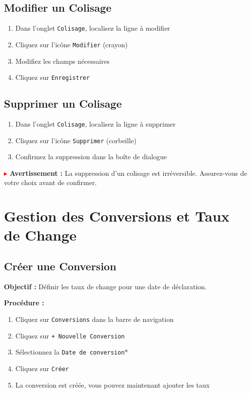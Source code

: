 \documentclass[12pt,a4paper]{report}
\begin{document}
\subsection{Modifier un Colisage}

\begin{enumerate}[leftmargin=*]
    \item Dans l'onglet \texttt{Colisage}, localisez la ligne à modifier
    \item Cliquez sur l'icône \texttt{Modifier} (crayon)
    \item Modifiez les champs nécessaires
    \item Cliquez sur \texttt{Enregistrer}
\end{enumerate}

\subsection{Supprimer un Colisage}

\begin{enumerate}[leftmargin=*]
    \item Dans l'onglet \texttt{Colisage}, localisez la ligne à supprimer
    \item Cliquez sur l'icône \texttt{Supprimer} (corbeille)
    \item Confirmez la suppression dans la boîte de dialogue
\end{enumerate}

\textcolor{red}{$\blacktriangleright$} \textbf{Avertissement :} La suppression d'un colisage est irréversible. Assurez-vous de votre choix avant de confirmer.

\section{Gestion des Conversions et Taux de Change}

\subsection{Créer une Conversion}

\textbf{Objectif :} Définir les taux de change pour une date de déclaration.

\textbf{Procédure :}

\begin{enumerate}[leftmargin=*]
    \item Cliquez sur \texttt{Conversions} dans la barre de navigation
    \item Cliquez sur \texttt{+ Nouvelle Conversion}
    \item Sélectionnez la \texttt{Date de conversion}*
    \item Cliquez sur \texttt{Créer}
    \item La conversion est créée, vous pouvez maintenant ajouter les taux
\end{enumerate}
\end{document}
